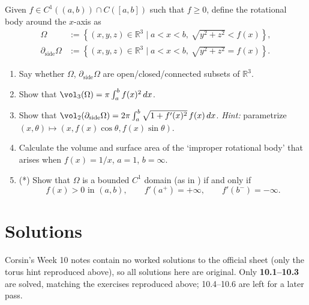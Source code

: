 \begin{exercise}
\label{ex:10.3}
Given $f \in C^1((a,b))\cap C([a,b])$ such that $f\geq0$, define the \textnormal{rotational
body around the $x$-axis} as
\[\begin{aligned}
  \Omega &:= \left\{(x,y,z)\in\mathbb{R}^3 \mid a<x<b,\ \sqrt{y^2+z^2}<f(x)\right\}, \\
  \partial_{\mathrm{side}}\Omega &:= \left\{(x,y,z)\in\mathbb{R}^3 \mid a<x<b,\ \sqrt{y^2+z^2}=f(x)\right\}.
\end{aligned}\]
\begin{enumerate}[label=\textbf{\arabic*.}]
  \item Say whether $\Omega$, $\partial_{\mathrm{side}}\Omega$ are open/closed/connected
    subsets of $\mathbb{R}^3$.
  \item Show that $\vol_3(\Omega) = \pi\int_a^b f(x)^2\,dx$.
  \item Show that $\vol_2(\partial_{\mathrm{side}}\Omega) = 2\pi\int_a^b
    \sqrt{1+f'(x)^2}\,f(x)\,dx$. \textit{Hint:} parametrize $(x,\theta)\mapsto (x,f(x)\cos\theta,
    f(x)\sin\theta)$.
  \item Calculate the volume and surface area of the `improper rotational body' that arises
    when $f(x)=1/x$, $a=1$, $b=\infty$.
  \item \textnormal{(*)} Show that $\Omega$ is a bounded $C^1$ domain (as in
    ) if and only if
    \begin{equation}
    f(x)>0 \text{ in } (a,b), \qquad f'(a^+)=+\infty, \qquad f'(b^-)=-\infty. \tag{$*$}
    \end{equation}
\end{enumerate}
\end{exercise}

\section{Solutions}
\label{sec:week10_solutions}

\begin{ainote}
Corsin's Week 10 notes contain no worked solutions to the official sheet (only the torus hint
reproduced above), so all solutions here are original. Only \textbf{10.1--10.3} are solved,
matching the exercises reproduced above; 10.4--10.6 are left for a later pass.
\end{ainote}


